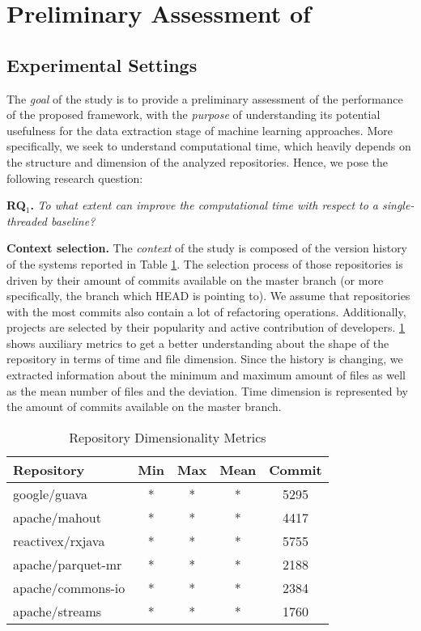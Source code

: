 
\section{Preliminary Assessment of \iris}
\label{sec:assessment}

\subsection{Experimental Settings}
\label{sec:method}
The \emph{goal} of the study is to provide a preliminary assessment of the performance of the proposed framework, with the \emph{purpose} of understanding its potential usefulness for the data extraction stage of machine learning approaches. More specifically, we seek to understand computational time, which heavily depends on the structure and dimension of the analyzed repositories. Hence, we pose the following research question:

\begin{center}
	\begin{examplebox}
		\textbf{RQ$_1$.} \emph{To what extent can \iris improve the computational time with respect to a single-threaded baseline?}	
	\end{examplebox}
\end{center}

\textbf{Context selection.} The \emph{context} of the study is composed of the version history of the systems reported in Table \ref{tab:systems}. The selection process of those repositories is driven by their amount of commits available on the master branch (or more specifically, the branch which HEAD is pointing to). We assume that repositories with the most commits also contain a lot of refactoring operations. Additionally, projects are selected by their popularity and active contribution of developers. \ref{tab:systems} shows auxiliary metrics to get a better understanding about the shape of the repository in terms of time and file dimension. Since the history is changing, we extracted information about the minimum and maximum amount of files as well as the mean number of files and the deviation. Time dimension is represented by the amount of commits available on the master branch.

\begin{table}[htbp]
\caption{Repository Dimensionality Metrics}
\label{tab:systems}
\begin{center}
\begin{tabular}{|l|c|c|c|c|}
\hline
\textbf{Repository}&\textbf{Min}&\textbf{Max}&\textbf{Mean}&\textbf{Commit}\\
\hline
google/guava& * & * & * & 5295\\
\hline
apache/mahout& * & * & * & 4417\\
\hline
reactivex/rxjava& * & * & * & 5755\\
\hline
apache/parquet-mr & * & * & * & 2188\\
\hline
apache/commons-io & * & * & * & 2384\\
\hline
apache/streams & * & * & * & 1760\\
\hline
\end{tabular}
\end{center}
\end{table}

